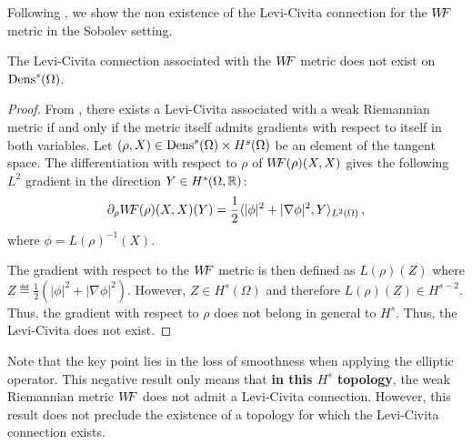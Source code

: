Following \cite{SobolevMetricsCurvature}, we show the non existence of the Levi-Civita connection for the $W\! \! F$ metric in the Sobolev setting.


\begin{proposition}\label{th:NonExistenceLC}
The Levi-Civita connection associated with the $W\! \! F$ metric does not exist on $\operatorname{Dens}^s(\Omega)$.
\end{proposition}

\begin{proof}
From \cite[page 8]{SobolevMetricsCurvature}, there exists a Levi-Civita associated with a weak Riemannian metric if and only if the metric itself admits gradients with respect to itself in both variables.
Let $(\rho, X) \in \operatorname{Dens}^s(\Omega) \times H^s(\Omega)$ be an element of the tangent space.
The differentiation with respect to $\rho$ of $W\! \! F(\rho)(X,X)$ gives the following $L^2$ gradient in the direction $Y \in H^s(\Omega,\mathbb{R})$:
\begin{equation}
\partial_\rho W\! \! F(\rho)(X,X)(Y) = \frac 12 \langle  |\phi|^2 + | \nabla \phi |^2 , Y \rangle_{L^2(\Omega)}\,,
\end{equation}
where $\phi = L(\rho)^{-1}(X)$. 

The gradient with respect to the $W\! \! F$ metric is then defined as $L(\rho)(Z)$ where $Z\eqdef \frac12 (|\phi|^2 + | \nabla \phi |^2)$.
However, $Z \in H^s(\Omega)$ and therefore $L(\rho)(Z) \in H^{s-2}$. Thus, the gradient with respect to $\rho$ does not belong in general to $H^s$. Thus, the Levi-Civita does not exist.
\end{proof}
Note that the key point lies in the loss of smoothness when applying the elliptic operator.
This negative result only means that \textbf{in this $H^s$ topology}, the weak Riemannian metric $W\! \! F$ does not admit a Levi-Civita connection. However, this result does not preclude the existence of a topology for which the Levi-Civita connection exists. 
%

